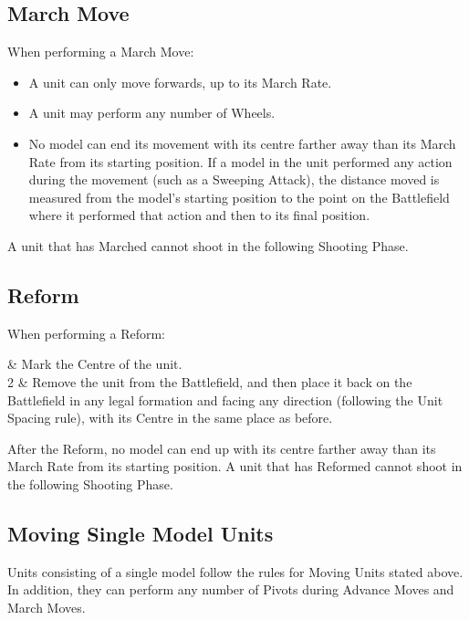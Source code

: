 \subsection{March Move}
\label{march_move}

When performing a March Move:

\begin{itemize}
\item A unit can only move forwards, up to its March Rate.
\item A unit may perform any number of Wheels.
\item No model can end its movement with its centre farther away than its March Rate from its starting position. If a model in the unit performed any action during the movement (such as a Sweeping Attack), the distance moved is measured from the model's starting position to the point on the Battlefield where it performed that action and then to its final position.
\end{itemize}

A unit that has Marched cannot shoot in the following Shooting Phase.

\subsection{Reform}
\label{reform}

When performing a Reform:

 & Mark the Centre of the unit.\\
2 & Remove the unit from the Battlefield, and then place it back on the Battlefield in any legal formation and facing any direction (following the Unit Spacing rule), with its Centre in the same place as before.\\
\closeseqtable

After the Reform, no model can end up with its centre farther away than its March Rate from its starting position. A unit that has Reformed cannot shoot in the following Shooting Phase.

\subsection{Moving Single Model Units}
\label{moving_single_model_units}

Units consisting of a single model follow the rules for Moving Units stated above. In addition, they can perform any number of Pivots during Advance Moves and March Moves.

